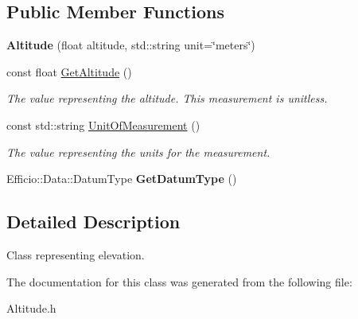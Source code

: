 \subsection*{Public Member Functions}
\begin{DoxyCompactItemize}
\item 
{\bfseries Altitude} (float altitude, std\+::string unit=\char`\"{}meters\char`\"{})\hypertarget{class_efficio_1_1_data_1_1_positional_1_1_altitude_a38d0f85abfd177bd4d2986393ca607b9}{}\label{class_efficio_1_1_data_1_1_positional_1_1_altitude_a38d0f85abfd177bd4d2986393ca607b9}

\item 
const float \hyperlink{class_efficio_1_1_data_1_1_positional_1_1_altitude_ae59bb8cdeff5bf7b61c0e690c475b415}{Get\+Altitude} ()\hypertarget{class_efficio_1_1_data_1_1_positional_1_1_altitude_ae59bb8cdeff5bf7b61c0e690c475b415}{}\label{class_efficio_1_1_data_1_1_positional_1_1_altitude_ae59bb8cdeff5bf7b61c0e690c475b415}

\begin{DoxyCompactList}\small\item\em The value representing the altitude. This measurement is unitless. \end{DoxyCompactList}\item 
const std\+::string \hyperlink{class_efficio_1_1_data_1_1_positional_1_1_altitude_a1ebb1e216cdb6b5acefbb00bc7dc1495}{Unit\+Of\+Measurement} ()\hypertarget{class_efficio_1_1_data_1_1_positional_1_1_altitude_a1ebb1e216cdb6b5acefbb00bc7dc1495}{}\label{class_efficio_1_1_data_1_1_positional_1_1_altitude_a1ebb1e216cdb6b5acefbb00bc7dc1495}

\begin{DoxyCompactList}\small\item\em The value representing the units for the measurement. \end{DoxyCompactList}\item 
Efficio\+::\+Data\+::\+Datum\+Type {\bfseries Get\+Datum\+Type} ()\hypertarget{class_efficio_1_1_data_1_1_positional_1_1_altitude_a87f46ce7c86ec2bf7b8f5496c186b991}{}\label{class_efficio_1_1_data_1_1_positional_1_1_altitude_a87f46ce7c86ec2bf7b8f5496c186b991}

\end{DoxyCompactItemize}


\subsection{Detailed Description}
Class representing elevation. 

The documentation for this class was generated from the following file\+:\begin{DoxyCompactItemize}
\item 
Altitude.\+h\end{DoxyCompactItemize}
